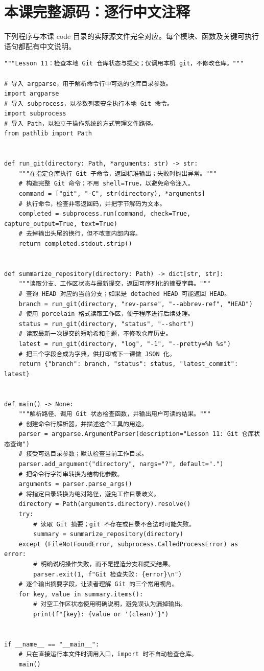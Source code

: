 \documentclass[UTF8,11pt,a4paper]{ctexart}
\begin{document}
\section{本课完整源码：逐行中文注释}
下列程序与本课 code 目录的实际源文件完全对应。每个模块、函数及关键可执行语句都配有中文说明。
\begin{Verbatim}[fontsize=\scriptsize,breaklines=true,breakanywhere=true]
"""Lesson 11：检查本地 Git 仓库状态与提交；仅调用本机 git，不修改仓库。"""

# 导入 argparse，用于解析命令行中可选的仓库目录参数。
import argparse
# 导入 subprocess，以参数列表安全执行本地 Git 命令。
import subprocess
# 导入 Path，以独立于操作系统的方式管理文件路径。
from pathlib import Path


def run_git(directory: Path, *arguments: str) -> str:
    """在指定仓库执行 Git 子命令，返回标准输出；失败时抛出异常。"""
    # 构造完整 Git 命令；不用 shell=True，以避免命令注入。
    command = ["git", "-C", str(directory), *arguments]
    # 执行命令，检查非零返回码，并把字节解码为文本。
    completed = subprocess.run(command, check=True, capture_output=True, text=True)
    # 去掉输出头尾的换行，但不改变内部内容。
    return completed.stdout.strip()


def summarize_repository(directory: Path) -> dict[str, str]:
    """读取分支、工作区状态与最新提交，返回可序列化的摘要字典。"""
    # 查询 HEAD 对应的当前分支；如果是 detached HEAD 可能返回 HEAD。
    branch = run_git(directory, "rev-parse", "--abbrev-ref", "HEAD")
    # 使用 porcelain 格式读取工作区，便于程序进行后续处理。
    status = run_git(directory, "status", "--short")
    # 读取最新一次提交的短哈希和主题，不修改仓库历史。
    latest = run_git(directory, "log", "-1", "--pretty=%h %s")
    # 把三个字段合成为字典，供打印或下一课做 JSON 化。
    return {"branch": branch, "status": status, "latest_commit": latest}


def main() -> None:
    """解析路径、调用 Git 状态检查函数，并输出用户可读的结果。"""
    # 创建命令行解析器，并描述这个工具的用途。
    parser = argparse.ArgumentParser(description="Lesson 11: Git 仓库状态查询")
    # 接受可选目录参数；默认检查当前工作目录。
    parser.add_argument("directory", nargs="?", default=".")
    # 把命令行字符串转换为结构化参数。
    arguments = parser.parse_args()
    # 将指定目录转换为绝对路径，避免工作目录歧义。
    directory = Path(arguments.directory).resolve()
    try:
        # 读取 Git 摘要；git 不存在或目录不合法时可能失败。
        summary = summarize_repository(directory)
    except (FileNotFoundError, subprocess.CalledProcessError) as error:
        # 明确说明操作失败，而不是捏造分支和提交结果。
        parser.exit(1, f"Git 检查失败: {error}\n")
    # 逐个输出摘要字段，让读者理解 Git 的三个常用视角。
    for key, value in summary.items():
        # 对空工作区状态使用明确说明，避免误认为漏掉输出。
        print(f"{key}: {value or '(clean)'}")


if __name__ == "__main__":
    # 只在直接运行本文件时调用入口，import 时不自动检查仓库。
    main()
\end{Verbatim}
\end{document}
